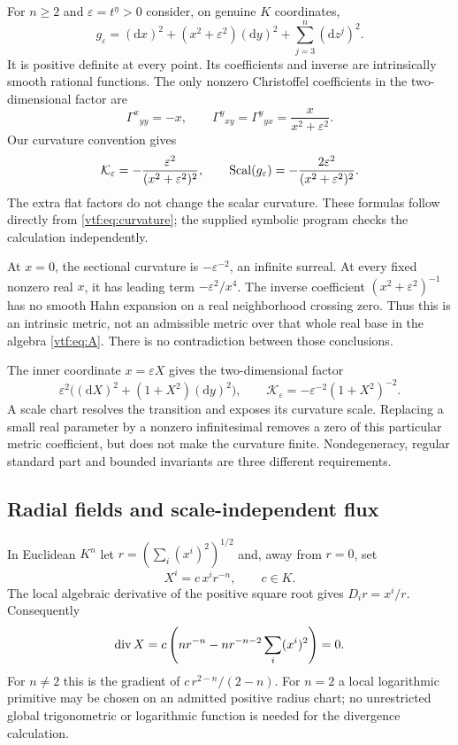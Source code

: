 \documentclass[11pt,letterpaper]{article}
\theoremstyle{definition}
\theoremstyle{remark}
\newcommand{\dd}{\mathrm d}
\newcommand{\eps}{\varepsilon}
\begin{document}
For $n\ge2$ and $\eps=t^\eta>0$ consider, on genuine $K$ coordinates,
\begin{equation}\label{vtf:eq:warped}
 g_\eps=(\dd x)^2+(x^2+\eps^2)(\dd y)^2
          +\sum_{j=3}^n(\dd z^j)^2.
\end{equation}
It is positive definite at every point. Its coefficients and inverse are
intrinsically smooth rational functions. The only nonzero Christoffel
coefficients in the two-dimensional factor are
\[
 \Gamma^x{}_{yy}=-x,\qquad
 \Gamma^y{}_{xy}=\Gamma^y{}_{yx}=\frac{x}{x^2+\eps^2}.
\]
Our curvature convention gives
\begin{equation}\label{vtf:eq:warpedcurv}
 \mathcal K_\eps=-\frac{\eps^2}{(x^2+\eps^2)^2},\qquad
 \Scal(g_\eps)=-\frac{2\eps^2}{(x^2+\eps^2)^2}.
\end{equation}
The extra flat factors do not change the scalar curvature. These formulas
follow directly from \eqref{vtf:eq:curvature}; the supplied symbolic program
checks the calculation independently.

At $x=0$, the sectional curvature is $-\eps^{-2}$, an infinite surreal.
At every fixed nonzero real $x$, it has leading term $-\eps^2/x^4$.
The inverse coefficient $(x^2+\eps^2)^{-1}$ has no smooth Hahn expansion
on a real neighborhood crossing zero. Thus this is an intrinsic metric, not
an admissible metric over that whole real base in the algebra
\eqref{vtf:eq:A}. There is no contradiction between those conclusions.

The inner coordinate $x=\eps X$ gives the two-dimensional factor
\[
 \eps^2\bigl((\dd X)^2+(1+X^2)(\dd y)^2\bigr),
 \qquad \mathcal K_\eps=-\eps^{-2}(1+X^2)^{-2}.
\]
A scale chart resolves the transition and exposes its curvature scale.
Replacing a small real parameter by a nonzero infinitesimal removes a zero
of this particular metric coefficient, but does not make the curvature
finite. Nondegeneracy, regular standard part and bounded invariants are
three different requirements.

\subsection{Radial fields and scale-independent flux}\label{vtf:subsec:radial}

In Euclidean $K^n$ let $r=(\sum_i(x^i)^2)^{1/2}$ and, away from $r=0$, set
\[
 X^i=c\,x^i r^{-n},\qquad c\in K.
\]
The local algebraic derivative of the positive square root gives
$D_i r=x^i/r$. Consequently
\[
 \operatorname{div} X=c\left(nr^{-n}-nr^{-n-2}\sum_i(x^i)^2\right)=0.
\]
For $n\ne2$ this is the gradient of $c\,r^{2-n}/(2-n)$.
For $n=2$ a local logarithmic primitive may be chosen on an admitted positive
radius chart; no unrestricted global trigonometric or logarithmic function
is needed for the divergence calculation.
\end{document}
